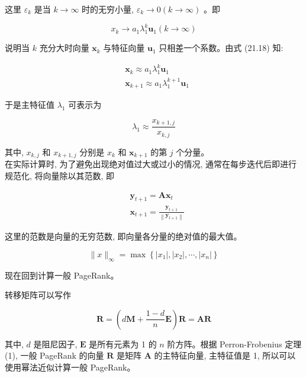 \documentclass[10pt]{article}
\begin{document}
\begin{CJK*}{UTF8}{bsmi}
这里 $\varepsilon_{k}$ 是当 $k \rightarrow \infty$ 时的无穷小量, $\varepsilon_{k} \rightarrow 0(k \rightarrow \infty)$ 。即


\begin{equation*}
x_{k} \rightarrow a_{1} \lambda_{1}^{k} \boldsymbol{u}_{1}(k \rightarrow \infty) \tag{21.18}
\end{equation*}


说明当 $k$ 充分大时向量 $\boldsymbol{x}_{k}$ 与特征向量 $\boldsymbol{u}_{1}$ 只相差一个系数。由式 (21.18) 知:

$$
\begin{aligned}
& \boldsymbol{x}_{k} \approx a_{1} \lambda_{1}^{k} \boldsymbol{u}_{1} \\
& \boldsymbol{x}_{k+1} \approx a_{1} \lambda_{1}^{k+1} \boldsymbol{u}_{1}
\end{aligned}
$$

于是主特征值 $\lambda_{1}$ 可表示为


\begin{equation*}
\lambda_{1} \approx \frac{x_{k+1, j}}{x_{k, j}} \tag{21.19}
\end{equation*}


其中, $x_{k, j}$ 和 $x_{k+1, j}$ 分别是 $x_{k}$ 和 $\boldsymbol{x}_{k+1}$ 的第 $j$ 个分量。\\
在实际计算时, 为了避免出现绝对值过大或过小的情况, 通常在每步迭代后即进行规范化, 将向量除以其范数, 即


\begin{align*}
& \boldsymbol{y}_{t+1}=\boldsymbol{A} \boldsymbol{x}_{t}  \tag{21.20}\\
& \boldsymbol{x}_{t+1}=\frac{\boldsymbol{y}_{t+1}}{\left\|\boldsymbol{y}_{t+1}\right\|} \tag{21.21}
\end{align*}


这里的范数是向量的无穷范数, 即向量各分量的绝对值的最大值。

$$
\|x\|_{\infty}=\max \left\{\left|x_{1}\right|,\left|x_{2}\right|, \cdots,\left|x_{n}\right|\right\}
$$

现在回到计算一般 PageRank。

转移矩阵可以写作


\begin{equation*}
\boldsymbol{R}=\left(d \boldsymbol{M}+\frac{1-d}{n} \boldsymbol{E}\right) \boldsymbol{R}=\boldsymbol{A} \boldsymbol{R} \tag{21.22}
\end{equation*}


其中, $d$ 是阻尼因子, $\boldsymbol{E}$ 是所有元素为 1 的 $n$ 阶方阵。根据 Perron-Frobenius 定理 (1), 一般 PageRank 的向量 $\boldsymbol{R}$ 是矩阵 $\boldsymbol{A}$ 的主特征向量, 主特征值是 1, 所以可以使用幂法近似计算一般 PageRank。


\end{CJK*}
\end{document}
